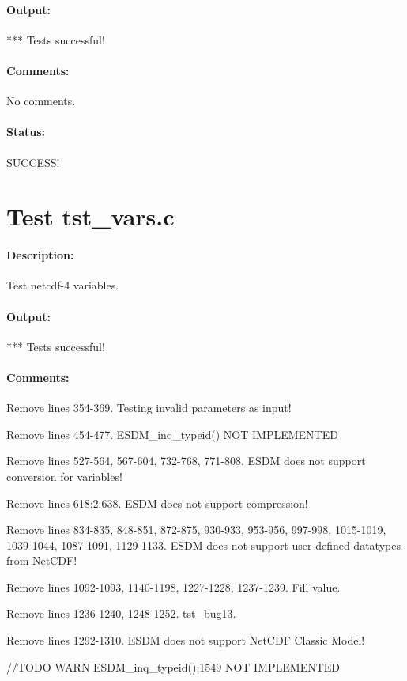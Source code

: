 \paragraph{Output:} *** Tests successful!

\paragraph{Comments:} No comments.

\paragraph{Status:} SUCCESS!

\section{Test tst\_vars.c}

\paragraph{Description:} Test netcdf-4 variables.

\paragraph{Output:} *** Tests successful!

\paragraph{Comments:} Remove lines 354-369. Testing invalid parameters as input!

Remove lines 454-477. ESDM\_inq\_typeid() NOT IMPLEMENTED

Remove lines 527-564, 567-604, 732-768, 771-808. ESDM does not support conversion for variables!

Remove lines 618:2:638. ESDM does not support compression!

Remove lines 834-835, 848-851, 872-875, 930-933, 953-956, 997-998, 1015-1019, 1039-1044, 1087-1091, 1129-1133. ESDM does not support user-defined datatypes from NetCDF!

Remove lines 1092-1093, 1140-1198, 1227-1228, 1237-1239. Fill value.

Remove lines 1236-1240, 1248-1252. tst\_bug13.

Remove lines 1292-1310. ESDM does not support NetCDF Classic Model!

//TODO WARN ESDM\_inq\_typeid():1549 NOT IMPLEMENTED

